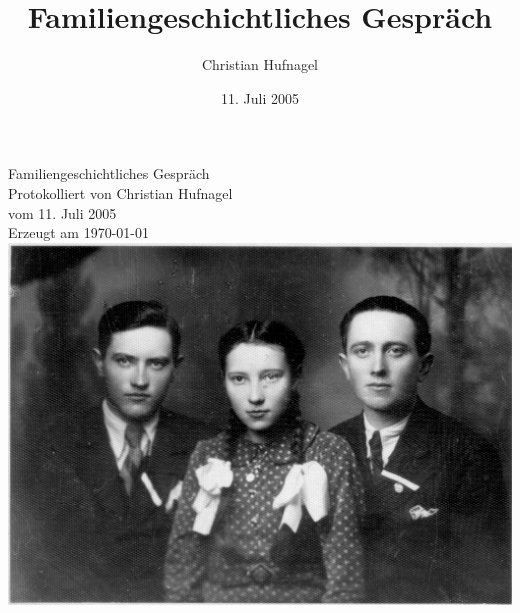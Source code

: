 \documentclass[ngerman,]{article}
\title{Familiengeschichtliches Gespräch}
\author{Christian Hufnagel}
\date{11. Juli 2005}
\begin{document}
	
					\begin{titlepage}
			\begin{centering}

							{\Huge Familiengeschichtliches Gespräch \\}
				\vspace{0.5cm}
				{\Large Protokolliert von Christian Hufnagel\\}
				\vspace{0.5cm}
				{\Large vom 11. Juli 2005\\}
				\vspace{0.5cm}
				{\normalsize Erzeugt am \today}
				\vfill
				\includegraphics{../bilder/HeinzHansKaethe-b.jpg}
			
			\end{centering}
			\end{titlepage}

		
		

		{
				\setcounter{tocdepth}{3}
		\tableofcontents
					}
	
\end{document}
